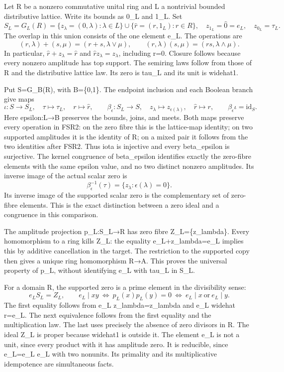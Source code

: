 \documentclass[
  10pt,
  a4paper,
]{article}
\begin{document}
Let R be a nonzero commutative unital ring and L a nontrivial bounded
distributive lattice. Write its bounds as 0\_L and 1\_L. Set \[
S_L=G_L(R)=\{z_\lambda=(0,\lambda):\lambda\in L\}
\cup\{\widehat r=(r,1_L):r\in R\},
\quad z_{1_L}=\widehat0=e_L,\quad z_{0_L}=\tau_L.
\tag{FSR1}
\] The overlap in this union consists of the one element e\_L. The
operations are \[
(r,\lambda)+(s,\mu)=(r+s,\lambda\vee\mu),\qquad
(r,\lambda)(s,\mu)=(rs,\lambda\wedge\mu).
\tag{FSR2}
\] In particular, \(\widehat r+z_\lambda=\widehat r\) and
\(\widehat r z_\lambda=z_\lambda\), including r=0. Closure follows
because every nonzero amplitude has top support. The semiring laws
follow from those of R and the distributive lattice law. Its zero is
tau\_L and its unit is widehat1.

Put S=G\_B(R), with B=\{0,1\}. The endpoint inclusion and each Boolean
branch give maps \[
\iota:S\longrightarrow S_L,\quad \tau\mapsto\tau_L,\quad r\mapsto\widehat r,
\qquad
\beta_\epsilon:S_L\longrightarrow S,\quad
z_\lambda\mapsto z_{\epsilon(\lambda)},\quad \widehat r\mapsto r,
\qquad \beta_\epsilon\iota=\mathrm{id}_S.
\tag{FSR3}
\] Here epsilon:L→B preserves the bounds, joins, and meets. Both maps
preserve every operation in FSR2: on the zero fibre this is the
lattice-map identity; on two supported amplitudes it is the identity of
R; on a mixed pair it follows from the two identities after FSR2. Thus
iota is injective and every beta\_epsilon is surjective. The kernel
congruence of beta\_epsilon identifies exactly the zero-fibre elements
with the same epsilon value, and no two distinct nonzero amplitudes. Its
inverse image of the actual scalar zero is \[
\beta_\epsilon^{-1}(\tau)=\{z_\lambda:\epsilon(\lambda)=0\}.
\tag{FSR4}
\] Its inverse image of the supported scalar zero is the complementary
set of zero-fibre elements. This is the exact distinction between a zero
ideal and a congruence in this comparison.

The amplitude projection p\_L:S\_L→R has zero fibre Z\_L=\{z\_lambda\}.
Every homomorphism to a ring kills Z\_L: the equality
e\_L+z\_lambda=e\_L implies this by additive cancellation in the target.
The restriction to the supported copy then gives a unique ring
homomorphism R→A. This proves the universal property of p\_L, without
identifying e\_L with tau\_L in S\_L.

For a domain R, the supported zero is a prime element in the
divisibility sense: \[
e_L S_L=Z_L,
\qquad e_L\mid xy\ \Longleftrightarrow\ p_L(x)p_L(y)=0
\ \Longleftrightarrow\ e_L\mid x\ \text{or}\ e_L\mid y.
\tag{FSR5}
\] The first equality follows from e\_L z\_lambda=z\_lambda and e\_L
widehat r=e\_L. The next equivalence follows from the first equality and
the multiplication law. The last uses precisely the absence of zero
divisors in R. The ideal Z\_L is proper because widehat1 is outside it.
The element e\_L is not a unit, since every product with it has
amplitude zero. It is reducible, since e\_L=e\_L e\_L with two nonunits.
Its primality and its multiplicative idempotence are simultaneous facts.
\end{document}
